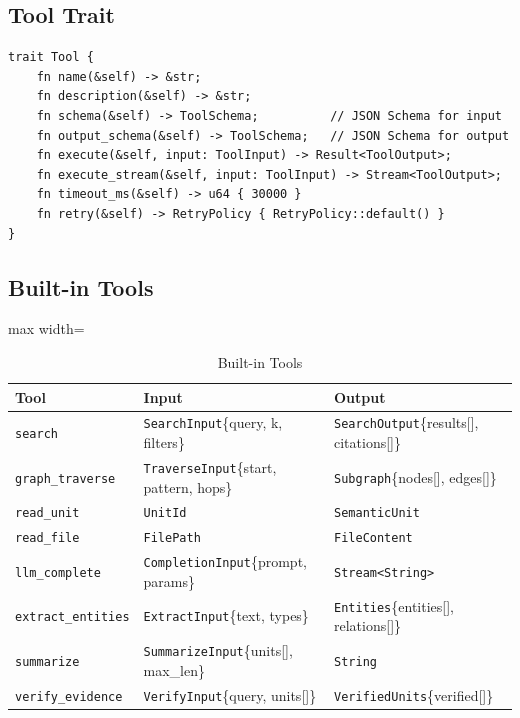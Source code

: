\subsection{Tool Trait}
\label{sec:runtime:tool-trait}

\begin{verbatim}
trait Tool {
    fn name(&self) -> &str;
    fn description(&self) -> &str;
    fn schema(&self) -> ToolSchema;          // JSON Schema for input
    fn output_schema(&self) -> ToolSchema;   // JSON Schema for output
    fn execute(&self, input: ToolInput) -> Result<ToolOutput>;
    fn execute_stream(&self, input: ToolInput) -> Stream<ToolOutput>;
    fn timeout_ms(&self) -> u64 { 30000 }
    fn retry(&self) -> RetryPolicy { RetryPolicy::default() }
}
\end{verbatim}

\subsection{Built-in Tools}
\label{sec:runtime:builtin-tools}

\begin{table}[htbp]
\centering
\caption{Built-in Tools}
\label{tab:runtime:builtin-tools}
\begin{adjustbox}{max width=\textwidth}
\begin{tabular}{lll}
\toprule
\textbf{Tool} & \textbf{Input} & \textbf{Output} \\
\midrule
\texttt{search} & \texttt{SearchInput}\{query, k, filters\} & \texttt{SearchOutput}\{results[], citations[]\} \\
\texttt{graph\_traverse} & \texttt{TraverseInput}\{start, pattern, hops\} & \texttt{Subgraph}\{nodes[], edges[]\} \\
\texttt{read\_unit} & \texttt{UnitId} & \texttt{SemanticUnit} \\
\texttt{read\_file} & \texttt{FilePath} & \texttt{FileContent} \\
\texttt{llm\_complete} & \texttt{CompletionInput}\{prompt, params\} & \texttt{Stream<String>} \\
\texttt{extract\_entities} & \texttt{ExtractInput}\{text, types\} & \texttt{Entities}\{entities[], relations[]\} \\
\texttt{summarize} & \texttt{SummarizeInput}\{units[], max\_len\} & \texttt{String} \\
\texttt{verify\_evidence} & \texttt{VerifyInput}\{query, units[]\} & \texttt{VerifiedUnits}\{verified[]\} \\
\bottomrule
\end{tabular}
\end{adjustbox}
\end{table}

